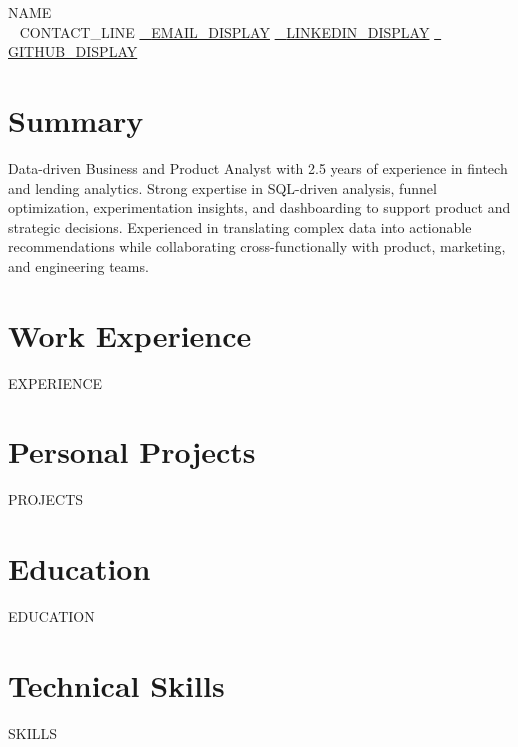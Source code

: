 \documentclass[letterpaper,11pt]{article}
\newcommand{\resumeSubHeadingListStart}{\begin{itemize}[leftmargin=0pt,label={}]}
\newcommand{\resumeSubHeadingListEnd}{\end{itemize}}
\begin{document}
\begin{center}
    {\Huge \scshape {{NAME}}} \\ \vspace{2pt}
    \small
    \faMapMarker*~ {{CONTACT_LINE}} \quad
    \href{mailto:{{EMAIL_URL}}}{\faEnvelope~ {{EMAIL_DISPLAY}}} \quad
    \href{{{LINKEDIN_URL}}}{\faLinkedin~ {{LINKEDIN_DISPLAY}}} \quad
    \href{{{GITHUB_URL}}}{\faGithub~ {{GITHUB_DISPLAY}}}
\end{center}

\section{Summary}
\small{
Data-driven Business and Product Analyst with 2.5 years of experience in fintech and lending analytics. Strong
expertise in SQL-driven analysis, funnel optimization, experimentation insights, and dashboarding to support
product and strategic decisions. Experienced in translating complex data into actionable recommendations while
collaborating cross-functionally with product, marketing, and engineering teams.
}
\vspace{-10pt}

\section{Work Experience}
\resumeSubHeadingListStart
{{EXPERIENCE}}
\resumeSubHeadingListEnd
\vspace{-10pt}

\section{Personal Projects}
\resumeSubHeadingListStart
{{PROJECTS}}
\resumeSubHeadingListEnd
\vspace{-10pt}

\section{Education}
\resumeSubHeadingListStart
{{EDUCATION}}
\resumeSubHeadingListEnd
\vspace{-10pt}

\section{Technical Skills}
\begin{itemize}[leftmargin=0.15in,label={},itemsep=0pt]
\small{
{{SKILLS}}
}
\end{itemize}
\end{document}
